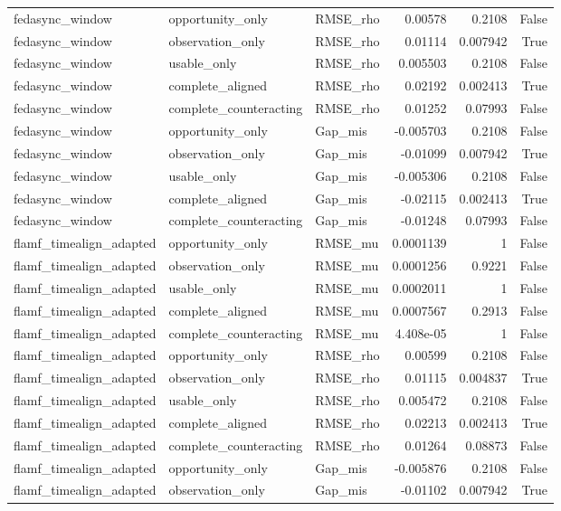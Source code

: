 \begin{table}
\begin{tabular}{lllrrr}
fedasync_window & opportunity_only & RMSE_rho & 0.00578 & 0.2108 & False \\
fedasync_window & observation_only & RMSE_rho & 0.01114 & 0.007942 & True \\
fedasync_window & usable_only & RMSE_rho & 0.005503 & 0.2108 & False \\
fedasync_window & complete_aligned & RMSE_rho & 0.02192 & 0.002413 & True \\
fedasync_window & complete_counteracting & RMSE_rho & 0.01252 & 0.07993 & False \\
fedasync_window & opportunity_only & Gap_mis & -0.005703 & 0.2108 & False \\
fedasync_window & observation_only & Gap_mis & -0.01099 & 0.007942 & True \\
fedasync_window & usable_only & Gap_mis & -0.005306 & 0.2108 & False \\
fedasync_window & complete_aligned & Gap_mis & -0.02115 & 0.002413 & True \\
fedasync_window & complete_counteracting & Gap_mis & -0.01248 & 0.07993 & False \\
flamf_timealign_adapted & opportunity_only & RMSE_mu & 0.0001139 & 1 & False \\
flamf_timealign_adapted & observation_only & RMSE_mu & 0.0001256 & 0.9221 & False \\
flamf_timealign_adapted & usable_only & RMSE_mu & 0.0002011 & 1 & False \\
flamf_timealign_adapted & complete_aligned & RMSE_mu & 0.0007567 & 0.2913 & False \\
flamf_timealign_adapted & complete_counteracting & RMSE_mu & 4.408e-05 & 1 & False \\
flamf_timealign_adapted & opportunity_only & RMSE_rho & 0.00599 & 0.2108 & False \\
flamf_timealign_adapted & observation_only & RMSE_rho & 0.01115 & 0.004837 & True \\
flamf_timealign_adapted & usable_only & RMSE_rho & 0.005472 & 0.2108 & False \\
flamf_timealign_adapted & complete_aligned & RMSE_rho & 0.02213 & 0.002413 & True \\
flamf_timealign_adapted & complete_counteracting & RMSE_rho & 0.01264 & 0.08873 & False \\
flamf_timealign_adapted & opportunity_only & Gap_mis & -0.005876 & 0.2108 & False \\
flamf_timealign_adapted & observation_only & Gap_mis & -0.01102 & 0.007942 & True \\

\end{tabular}
\end{table}

